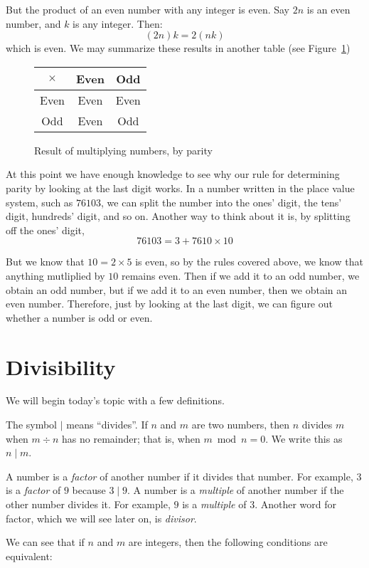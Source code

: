 \documentclass[a4paper,10pt]{report}
\begin{document}
But the product of an even number with any integer is even. Say \(2n\) is an
even number, and \(k\) is any integer. Then: \[
 (2n)k = 2(nk)
\] which is even. We may summarize these results in another table (see
Figure~\ref{pd:pprodt})

\begin{figure}
 \begin{tabular}{c|cc}
  \(\times\) & Even & Odd  \\
  \hline
  Even   & Even & Even \\
  Odd    & Even & Odd
 \end{tabular}

 \caption{Result of multiplying numbers, by parity}
 \label{pd:pprodt}
\end{figure}

At this point we have enough knowledge to see why our rule for determining
parity by looking at the last digit works. In a number written in the place
value system, such as \(76103\), we can split the number into the ones' digit,
the tens' digit, hundreds' digit, and so on. Another way to think about it is,
by splitting off the ones' digit, \[
 76103 = 3 + 7610 \times 10
\]

But we know that \(10=2\times5\) is even, so by the rules covered above, we
know that anything mutliplied by \(10\) remains even. Then if we add it to an
odd number, we obtain an odd number, but if we add it to an even number, then
we obtain an even number. Therefore, just by looking at the last digit, we can
figure out whether a number is odd or even.

\section{Divisibility}

We will begin today's topic with a few definitions.

The symbol \(\mid\) means ``divides''. If \(n\) and \(m\) are two numbers, then
\(n\) divides \(m\) when \(m \div n\) has no remainder; that is, when \(m \bmod
n = 0\). We write this as \(n \mid m\).

A number is a \emph{factor} of another number if it divides that number. For
example, \(3\) is a \emph{factor} of \(9\) because \(3 \mid 9\). A number is a
\emph{multiple} of another number if the other number divides it. For example,
\(9\) is a \emph{multiple} of \(3\). Another word for factor, which we will see
later on, is \emph{divisor}.

We can see that if \(n\) and \(m\) are integers, then the following conditions
are \gls{equivalent}:
\end{document}
